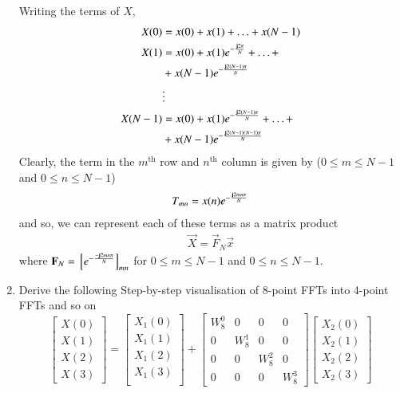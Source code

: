 \documentclass[journal,12pt,twocolumn]{IEEEtran}
\renewcommand\thesection{\arabic{section}}
\begin{document}
\begin{enumerate}[label=\thesection.\arabic*.,ref=\thesection.\theenumi]
\solution Writing the terms of $X$, 
\begin{align}
	X(0) &= x(0) + x(1) + \ldots + x(N - 1) \\
	X(1) &= x(0) + x(1)e^{-\frac{\mathbf{j}2\pi}{N}} + \ldots + \nonumber \\
		 &+ x(N - 1)e^{-\frac{\mathbf{j}2(N - 1)\pi}{N}} \\
		 &\vdots \nonumber \\
	X(N - 1) &= x(0) + x(1)e^{-\frac{\mathbf{j}2(N - 1)\pi}{N}} + \ldots + \nonumber \\
			 &+ x(N - 1)e^{-\frac{\mathbf{j}2(N - 1)(N - 1)\pi}{N}}	
\end{align}
Clearly, the term in the $m^{\text{th}}$ row and $n^{\text{th}}$ column is given by ($0 \leq m \leq N - 1$ and $0 \leq n \leq N - 1$) 
\begin{align}
	T_{mn} = x(n)e^{-\frac{\mathbf{j}2mn\pi}{N}} 
\end{align}
and so, we can represent each of these terms as a matrix product
\begin{align}
	\vec{X} = \vec{F}_N\vec{x}
\end{align}
where $\mathbf{F}_N = {}\left[e^{-\frac{-\mathbf{j}2mn\pi}{N}}\right]_{mn}$ for $0 \leq m \leq N - 1$ and $0 \leq n \leq N - 1$. 
\item Derive the following Step-by-step visualisation  of
8-point FFTs into 4-point FFTs and so on
\begin{equation}
\begin{bmatrix}
X(0) \\ 
X(1) \\ 
X(2) \\ 
X(3)
\end{bmatrix}
=
\begin{bmatrix}
X_{1}(0) \\ 
X_{1}(1)\\ 
X_{1}(2)\\
X_{1}(3)\\
\end{bmatrix}
+
\begin{bmatrix}
W^{0}_{8} & 0 & 0 & 0\\
0 & W^{1}_{8} & 0 & 0\\
0 & 0 & W^{2}_{8} & 0\\
0 & 0 & 0 & W^{3}_{8}
\end{bmatrix}
\begin{bmatrix}
X_{2}(0) \\ 
X_{2}(1) \\ 
X_{2}(2) \\
X_{2}(3)
\end{bmatrix}

\end{equation}
\end{enumerate}
\end{document}
